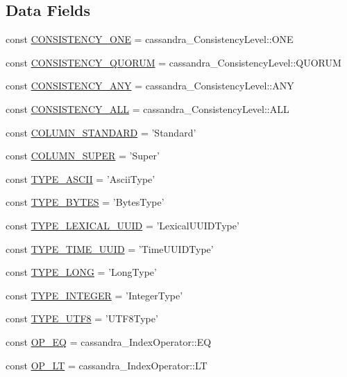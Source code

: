 \subsection*{Data Fields}
\begin{DoxyCompactItemize}
\item 
const \hyperlink{classCassandra_afd35e5b7419ce2915891c349a44b6f22}{CONSISTENCY\_\-ONE} = cassandra\_\-ConsistencyLevel::ONE
\item 
const \hyperlink{classCassandra_a58c08b49c2434526a62f74248c8b959d}{CONSISTENCY\_\-QUORUM} = cassandra\_\-ConsistencyLevel::QUORUM
\item 
const \hyperlink{classCassandra_a94fdd09de0798393d86a9965482cefa7}{CONSISTENCY\_\-ANY} = cassandra\_\-ConsistencyLevel::ANY
\item 
const \hyperlink{classCassandra_ac7e4763d615ce200970153894d53219a}{CONSISTENCY\_\-ALL} = cassandra\_\-ConsistencyLevel::ALL
\item 
const \hyperlink{classCassandra_a5b7fd78b8f044623445d9e9a8f175790}{COLUMN\_\-STANDARD} = 'Standard'
\item 
const \hyperlink{classCassandra_abf8e49b590d1e1b83d3e13cc133cd672}{COLUMN\_\-SUPER} = 'Super'
\item 
const \hyperlink{classCassandra_acc917786b5bbbdd6eb4783856bd5580c}{TYPE\_\-ASCII} = 'AsciiType'
\item 
const \hyperlink{classCassandra_ab75de9aa0588c7665f1c9d8cf8d4e8ff}{TYPE\_\-BYTES} = 'BytesType'
\item 
const \hyperlink{classCassandra_a2af16bdea44f4e16ba5c5baa5380b9f0}{TYPE\_\-LEXICAL\_\-UUID} = 'LexicalUUIDType'
\item 
const \hyperlink{classCassandra_a42861ad94788ba940228767a79f1c4c7}{TYPE\_\-TIME\_\-UUID} = 'TimeUUIDType'
\item 
const \hyperlink{classCassandra_acf64f8105c4bfe0c95f868437299442f}{TYPE\_\-LONG} = 'LongType'
\item 
const \hyperlink{classCassandra_a4160c654a18aead3a642fd1f3f2415e9}{TYPE\_\-INTEGER} = 'IntegerType'
\item 
const \hyperlink{classCassandra_ac03a89bd430178d9bce987eba8001b82}{TYPE\_\-UTF8} = 'UTF8Type'
\item 
const \hyperlink{classCassandra_a33b81650dd46405f23e6d469eeb1bd5b}{OP\_\-EQ} = cassandra\_\-IndexOperator::EQ
\item 
const \hyperlink{classCassandra_acf59b31536a8a886422ef7335020f99d}{OP\_\-LT} = cassandra\_\-IndexOperator::LT
\item 

\end{DoxyCompactItemize}
